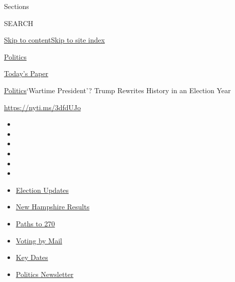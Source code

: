 Sections

SEARCH

\protect\hyperlink{site-content}{Skip to
content}\protect\hyperlink{site-index}{Skip to site index}

\href{https://www.nytimes3xbfgragh.onion/section/politics}{Politics}

\href{https://myaccount.nytimes3xbfgragh.onion/auth/login?response_type=cookie\&client_id=vi}{}

\href{https://www.nytimes3xbfgragh.onion/section/todayspaper}{Today's
Paper}

\href{/section/politics}{Politics}\textbar{}`Wartime President'? Trump
Rewrites History in an Election Year

\url{https://nyti.ms/3dfdUJo}

\begin{itemize}
\item
\item
\item
\item
\item
\item
\end{itemize}

\begin{itemize}
\item
  \href{https://www.nytimes3xbfgragh.onion/live/2020/09/09/us/trump-vs-biden?action=click\&pgtype=Article\&state=default\&region=TOP_BANNER\&context=storylines_menu}{Election
  Updates}
\item
  \href{https://www.nytimes3xbfgragh.onion/interactive/2020/09/08/us/elections/results-new-hampshire-primary-elections.html?action=click\&pgtype=Article\&state=default\&region=TOP_BANNER\&context=storylines_menu}{New
  Hampshire Results}
\item
  \href{https://www.nytimes3xbfgragh.onion/interactive/2020/us/elections/election-states-biden-trump.html?action=click\&pgtype=Article\&state=default\&region=TOP_BANNER\&context=storylines_menu}{Paths
  to 270}
\item
  \href{https://www.nytimes3xbfgragh.onion/interactive/2020/08/31/us/politics/vote-by-mail-deadlines.html?action=click\&pgtype=Article\&state=default\&region=TOP_BANNER\&context=storylines_menu}{Voting
  by Mail}
\item
  \href{https://www.nytimes3xbfgragh.onion/interactive/2019/us/elections/2020-presidential-election-calendar.html?action=click\&pgtype=Article\&state=default\&region=TOP_BANNER\&context=storylines_menu}{Key
  Dates}
\item
  \href{https://www.nytimes3xbfgragh.onion/newsletters/politics?action=click\&pgtype=Article\&state=default\&region=TOP_BANNER\&context=storylines_menu}{Politics
  Newsletter}
\end{itemize}

